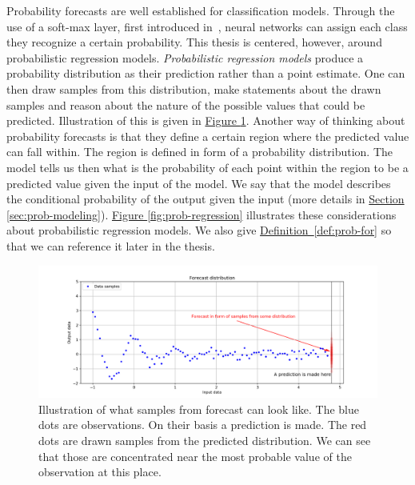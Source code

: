 \documentclass[12pt,a4paper,twoside]{scrartcl}
\numberwithin{equation}{section}
\newcommand{\refdef}[1]{\hyperref[#1]{Definition~\ref*{#1}}}
\newcommand{\reffig}[1]{\hyperref[#1]{Figure \ref*{#1}}}
\newcommand{\refsec}[1]{\hyperref[#1]{Section \ref*{#1}}}
\begin{document}
Probability forecasts are well established for classification models. Through the use of a soft-max layer, first introduced in~\cite{denker1990}, neural networks can assign each class they recognize a certain probability. This thesis is centered, however, around probabilistic regression models. \emph{Probabilistic regression models} produce a probability distribution as their prediction rather than a point estimate. One can then draw samples from this distribution, make statements about the drawn samples and reason about the nature of the possible values that could be predicted. Illustration of this is given in \reffig{fig:pred-dist-draws}. Another way of thinking about probability forecasts is that they define a certain region where the predicted value can fall within. The region is defined in form of a probability distribution. The model tells us then what is the probability of each point within the region to be a predicted value given the input of the model. We say that the model describes the conditional probability of the output given the input (more details in \refsec{sec:prob-modeling}). \reffig{fig:prob-regression} illustrates these considerations about probabilistic regression models. We also give \refdef{def:prob-for} so that we can reference it later in the thesis.
\begin{center}
  \begin{figure}[H]
    \centering
    \includegraphics[height=0.5\textwidth, width=1.0\textwidth]{figures/forecast.png}
    \caption[Forecast sample draws]{Illustration of what samples from forecast can look like. The blue dots are observations. On their basis a prediction is made. The red dots are drawn samples from the predicted distribution. We can see that those are concentrated near the most probable value of the observation at this place.}\label{fig:pred-dist-draws}
  \end{figure}
\end{center}
\end{document}
